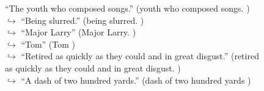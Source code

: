 \documentclass[11pt,a4paper, onecolumn]{article}
\begin{document}
\begin{figure}[t]
\begin{tcolorbox}[boxsep=0pt,left=5pt,right=0pt,top=2pt,colback = yellow!5]
\begin{dialogue}
{ ``The youth who composed songs.'' (youth who composed songs. ) }
\\
\colorbox{pink!25}{$\hookrightarrow$}
{ ``Being slurred.'' (being slurred. ) }
\\
\colorbox{pink!25}{$\hookrightarrow$}
{ ``Major Larry'' (Major Larry. ) }
\\
\colorbox{pink!25}{$\hookrightarrow$}
{ ``Tom'' (Tom ) }
\\
\colorbox{pink!25}{$\hookrightarrow$}
{ ``Retired as quickly as they could and in great disgust.'' (retired as quickly as they could and in great disgust. ) }
\\
\colorbox{pink!25}{$\hookrightarrow$}
{ ``A dash of two hundred yards.'' (dash of two hundred yards ) }
 \end{dialogue}\end{tcolorbox}\end{figure}
\end{document}
